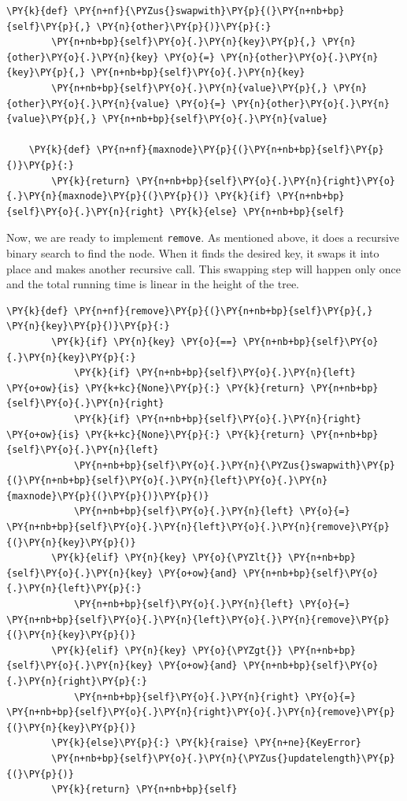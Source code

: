 \begin{Verbatim}[commandchars=\\\{\}]
    \PY{k}{def} \PY{n+nf}{\PYZus{}swapwith}\PY{p}{(}\PY{n+nb+bp}{self}\PY{p}{,} \PY{n}{other}\PY{p}{)}\PY{p}{:}
        \PY{n+nb+bp}{self}\PY{o}{.}\PY{n}{key}\PY{p}{,} \PY{n}{other}\PY{o}{.}\PY{n}{key} \PY{o}{=} \PY{n}{other}\PY{o}{.}\PY{n}{key}\PY{p}{,} \PY{n+nb+bp}{self}\PY{o}{.}\PY{n}{key}
        \PY{n+nb+bp}{self}\PY{o}{.}\PY{n}{value}\PY{p}{,} \PY{n}{other}\PY{o}{.}\PY{n}{value} \PY{o}{=} \PY{n}{other}\PY{o}{.}\PY{n}{value}\PY{p}{,} \PY{n+nb+bp}{self}\PY{o}{.}\PY{n}{value}

    \PY{k}{def} \PY{n+nf}{maxnode}\PY{p}{(}\PY{n+nb+bp}{self}\PY{p}{)}\PY{p}{:}
        \PY{k}{return} \PY{n+nb+bp}{self}\PY{o}{.}\PY{n}{right}\PY{o}{.}\PY{n}{maxnode}\PY{p}{(}\PY{p}{)} \PY{k}{if} \PY{n+nb+bp}{self}\PY{o}{.}\PY{n}{right} \PY{k}{else} \PY{n+nb+bp}{self}
\end{Verbatim}



Now, we are ready to implement \texttt{remove}.
As mentioned above, it does a recursive binary search to find the node.
When it finds the desired key, it swaps it into place and makes another recursive call.
This swapping step will happen only once and the total running time is linear in the height of the tree.

\begin{Verbatim}[commandchars=\\\{\}]
    \PY{k}{def} \PY{n+nf}{remove}\PY{p}{(}\PY{n+nb+bp}{self}\PY{p}{,} \PY{n}{key}\PY{p}{)}\PY{p}{:}
        \PY{k}{if} \PY{n}{key} \PY{o}{==} \PY{n+nb+bp}{self}\PY{o}{.}\PY{n}{key}\PY{p}{:}
            \PY{k}{if} \PY{n+nb+bp}{self}\PY{o}{.}\PY{n}{left} \PY{o+ow}{is} \PY{k+kc}{None}\PY{p}{:} \PY{k}{return} \PY{n+nb+bp}{self}\PY{o}{.}\PY{n}{right}
            \PY{k}{if} \PY{n+nb+bp}{self}\PY{o}{.}\PY{n}{right} \PY{o+ow}{is} \PY{k+kc}{None}\PY{p}{:} \PY{k}{return} \PY{n+nb+bp}{self}\PY{o}{.}\PY{n}{left}
            \PY{n+nb+bp}{self}\PY{o}{.}\PY{n}{\PYZus{}swapwith}\PY{p}{(}\PY{n+nb+bp}{self}\PY{o}{.}\PY{n}{left}\PY{o}{.}\PY{n}{maxnode}\PY{p}{(}\PY{p}{)}\PY{p}{)}
            \PY{n+nb+bp}{self}\PY{o}{.}\PY{n}{left} \PY{o}{=} \PY{n+nb+bp}{self}\PY{o}{.}\PY{n}{left}\PY{o}{.}\PY{n}{remove}\PY{p}{(}\PY{n}{key}\PY{p}{)}
        \PY{k}{elif} \PY{n}{key} \PY{o}{\PYZlt{}} \PY{n+nb+bp}{self}\PY{o}{.}\PY{n}{key} \PY{o+ow}{and} \PY{n+nb+bp}{self}\PY{o}{.}\PY{n}{left}\PY{p}{:}
            \PY{n+nb+bp}{self}\PY{o}{.}\PY{n}{left} \PY{o}{=} \PY{n+nb+bp}{self}\PY{o}{.}\PY{n}{left}\PY{o}{.}\PY{n}{remove}\PY{p}{(}\PY{n}{key}\PY{p}{)}
        \PY{k}{elif} \PY{n}{key} \PY{o}{\PYZgt{}} \PY{n+nb+bp}{self}\PY{o}{.}\PY{n}{key} \PY{o+ow}{and} \PY{n+nb+bp}{self}\PY{o}{.}\PY{n}{right}\PY{p}{:}
            \PY{n+nb+bp}{self}\PY{o}{.}\PY{n}{right} \PY{o}{=} \PY{n+nb+bp}{self}\PY{o}{.}\PY{n}{right}\PY{o}{.}\PY{n}{remove}\PY{p}{(}\PY{n}{key}\PY{p}{)}
        \PY{k}{else}\PY{p}{:} \PY{k}{raise} \PY{n+ne}{KeyError}
        \PY{n+nb+bp}{self}\PY{o}{.}\PY{n}{\PYZus{}updatelength}\PY{p}{(}\PY{p}{)}
        \PY{k}{return} \PY{n+nb+bp}{self}
\end{Verbatim}


